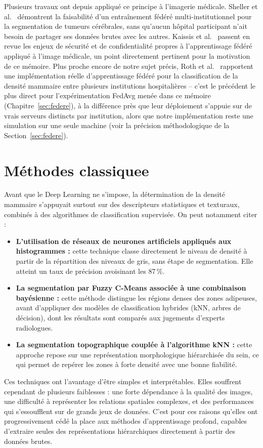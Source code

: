 \documentclass[12pt,a4paper]{report}
\begin{document}
Plusieurs travaux ont depuis appliqué ce principe à l'imagerie médicale.
Sheller et al.\ \cite{ref_sheller_fl_brain} démontrent la faisabilité d'un
entraînement fédéré multi-institutionnel pour la segmentation de tumeurs
cérébrales, sans qu'aucun hôpital participant n'ait besoin de partager ses
données brutes avec les autres. Kaissis et al.\
\cite{ref_kaissis_fl_privacy} passent en revue les enjeux de sécurité et de
confidentialité propres à l'apprentissage fédéré appliqué à l'image
médicale, un point directement pertinent pour la motivation de ce mémoire.
Plus proche encore de notre sujet précis, Roth et al.\
\cite{ref_roth_fl_breast_density} rapportent une implémentation réelle
d'apprentissage fédéré pour la classification de la densité mammaire entre
plusieurs institutions hospitalières -- c'est le précédent le plus direct
pour l'expérimentation FedAvg menée dans ce mémoire (Chapitre~\ref{sec:federe}),
à la différence près que leur déploiement s'appuie sur de vrais serveurs
distincts par institution, alors que notre implémentation reste une
simulation sur une seule machine (voir la précision méthodologique de la
Section~\ref{sec:federe}).

\section{Méthodes classiquee}

Avant que le Deep Learning ne s'impose, la détermination de la densité
mammaire s'appuyait surtout sur des descripteurs statistiques et texturaux,
combinés à des algorithmes de classification supervisée. On peut notamment
citer :\\
\begin{itemize}
    \item \textbf{L'utilisation de réseaux de neurones artificiels appliqués aux histogrammes :} cette technique classe directement le niveau de densité à partir de la répartition des niveaux de gris, sans étape de segmentation. Elle atteint un taux de précision avoisinant les 87\,\%.
\item \textbf{La segmentation par Fuzzy C-Means associée à une combinaison bayésienne :} cette méthode distingue les régions denses des zones adipeuses, avant d'appliquer des modèles de classification hybrides (kNN, arbres de décision), dont les résultats sont comparés aux jugements d'experts radiologues.
\item \textbf{La segmentation topographique couplée à l'algorithme kNN :} cette approche repose sur une représentation morphologique hiérarchisée du sein, ce qui permet de repérer les zones à forte densité avec une bonne fiabilité.
\end{itemize}
Ces techniques ont l'avantage d'être simples et interprétables. Elles
souffrent cependant de plusieurs faiblesses : une forte dépendance à la
qualité des images, une difficulté à représenter les relations spatiales
complexes, et des performances qui s'essoufflent sur de grands jeux de
données. C'est pour ces raisons qu'elles ont progressivement cédé la place
aux méthodes d'apprentissage profond, capables d'extraire seules des
représentations hiérarchiques directement à partir des données brutes.
\end{document}
